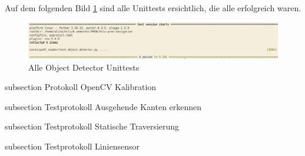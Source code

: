 Auf dem folgenden Bild \ref{img:object_detector_unittests} sind alle Unittests ersichtlich, die alle erfolgreich waren.

\begin{figure}[H]
\centering
\includegraphics[width=\textwidth]{assets/IT/testing/yolo/object-detector-unittests.png}
\caption{Alle Object Detector Unittests}
\label{img:object_detector_unittests}
\end{figure}






{subsection}
{Protokoll OpenCV Kalibration}






{subsection}
{Testprotokoll Ausgehende Kanten erkennen}





{subsection}
{Testprotokoll Statische Traversierung}




{subsection}
{Testprotokoll Liniensensor}






